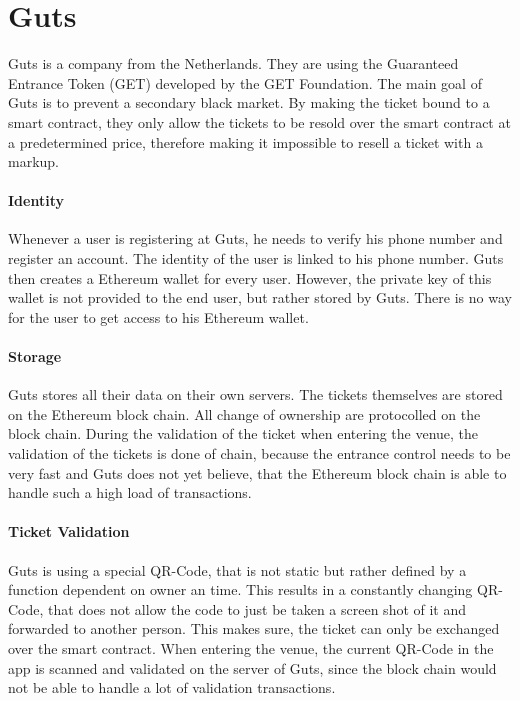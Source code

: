 
\section{Guts}
Guts \cite{GET_PROTOCOL} is a company from the Netherlands. They are using the Guaranteed Entrance Token (GET) developed by the GET Foundation. The main goal of Guts is to prevent a secondary black market. By making the ticket bound to a smart contract, they only allow the tickets to be resold over the smart contract at a predetermined price, therefore making it impossible to resell a ticket with a markup.

\paragraph{Identity}
Whenever a user is registering at Guts, he needs to verify his phone number and register an account. The identity of the user is linked to his phone number. Guts then creates a Ethereum wallet for every user. However, the private key of this wallet is not provided to the end user, but rather stored by Guts. There is no way for the user to get access to his Ethereum wallet.


\paragraph{Storage}
Guts stores all their data on their own servers. The tickets themselves are stored on the Ethereum block chain. All change of ownership are protocolled on the block chain. During the validation of the ticket when entering the venue, the validation of the tickets is done of chain, because the entrance control needs to be very fast and Guts does not yet believe, that the Ethereum block chain is able to handle such a high load of transactions.

\paragraph{Ticket Validation}
Guts is using a special QR-Code, that is not static but rather defined by a function dependent on owner an time. This results in a constantly changing QR-Code, that does not allow the code to just be taken a screen shot of it and forwarded to another person. This makes sure, the ticket can only be exchanged over the smart contract. When entering the venue, the current QR-Code in the app is scanned and validated on the server of Guts, since the block chain would not be able to handle a lot of validation transactions.



